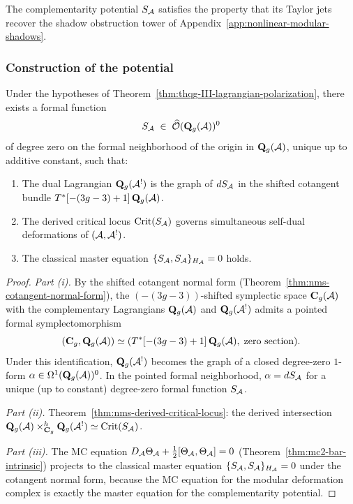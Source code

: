 The complementarity potential $S_{\mathcal{A}}$ satisfies the property
that its Taylor jets recover the shadow obstruction tower of
Appendix~\ref{app:nonlinear-modular-shadows}.

\subsubsection{Construction of the potential}
\label{subsubsec:thqg-III-potential-construction}

\begin{theorem}
\label{thm:thqg-III-complementarity-potential}
Under the hypotheses of
Theorem~\textup{\ref{thm:thqg-III-lagrangian-polarization}},
there exists a formal function
\begin{equation}\label{eq:thqg-III-potential-existence}
S_{\mathcal{A}}
\;\in\;
\widehat{\mathcal{O}}(\mathbf{Q}_g(\mathcal{A}))^0
\end{equation}
of degree zero on the formal neighborhood of the origin in
$\mathbf{Q}_g(\mathcal{A})$, unique up to additive constant, such that:
\begin{enumerate}[label=\textup{(\roman*)}]
\item The dual Lagrangian $\mathbf{Q}_g(\mathcal{A}^!)$ is the graph
 of $dS_{\mathcal{A}}$ in the shifted cotangent bundle
 $T^*[-(3g-3)+1]\,\mathbf{Q}_g(\mathcal{A})$.
\item The derived critical locus $\operatorname{Crit}(S_{\mathcal{A}})$
 governs simultaneous self-dual deformations of $(\mathcal{A}, \mathcal{A}^!)$.
\item The classical master equation
 $\{S_{\mathcal{A}}, S_{\mathcal{A}}\}_{H_{\mathcal{A}}} = 0$ holds.
\end{enumerate}
\end{theorem}

\begin{proof}
\emph{Part (i).}
By the shifted cotangent normal form
(Theorem~\ref{thm:nms-cotangent-normal-form}), the
$(-(3g-3))$-shifted symplectic space $\mathbf{C}_g(\mathcal{A})$ with
the complementary Lagrangians $\mathbf{Q}_g(\mathcal{A})$ and
$\mathbf{Q}_g(\mathcal{A}^!)$ admits a pointed formal
symplectomorphism
\[
(\mathbf{C}_g, \mathbf{Q}_g(\mathcal{A}))
\simeq
(T^*[-(3g-3)+1]\,\mathbf{Q}_g(\mathcal{A}),\; \text{zero section}).
\]
Under this identification, $\mathbf{Q}_g(\mathcal{A}^!)$ becomes the
graph of a closed degree-zero $1$-form
$\alpha \in \Omega^1(\mathbf{Q}_g(\mathcal{A}))^0$. In the pointed
formal neighborhood, $\alpha = dS_{\mathcal{A}}$ for a unique (up to
constant) degree-zero formal function $S_{\mathcal{A}}$.

\emph{Part (ii).}
Theorem~\ref{thm:nms-derived-critical-locus}: the derived
intersection $\mathbf{Q}_g(\mathcal{A}) \times^h_{\mathbf{C}_g}
\mathbf{Q}_g(\mathcal{A}^!) \simeq \operatorname{Crit}(S_{\mathcal{A}})$.

\emph{Part (iii).}
The MC equation
$D_{\mathcal{A}} \Theta_{\mathcal{A}} + \tfrac{1}{2}[\Theta_{\mathcal{A}}, \Theta_{\mathcal{A}}] = 0$
(Theorem~\ref{thm:mc2-bar-intrinsic}) projects to the
classical master equation $\{S_{\mathcal{A}}, S_{\mathcal{A}}\}_{H_{\mathcal{A}}} = 0$
under the cotangent normal form, because the MC equation for
the modular deformation complex is exactly the master equation
for the complementarity potential.
\end{proof}

